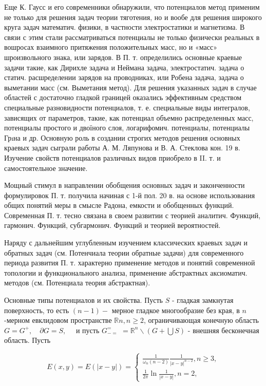 \documentclass[10pt]{article}
\begin{document}
Еще К. Гаусс и его современники обнаружили, что потенциалов метод применим не только для решения задач теории тяготения, но и вообе для решения широкого круга задач математич. физики, в частности электростатики и магнетизма. В связи с этим стали рассматриваться потенциалы не только физически реальных в вошросах взаимного притяжения положительных масс, но и «масс» шроизвольного знака, или зарядов. В П. т. определились основные краевые задачи такие, как Дирихле задача и Неймана задача, электростатич. задача о статич. расшределении зарядов на проводниках, или Робена задача, задача о выметании масс (см. Выметания метод). Для решения указанных задач в случае областей с достаточно гладкой границей оказались эффективным средством специальные разновидности потенциалов, т. е. специальные виды интегралов, зависящих от параметров, такие, как потенциал объемно распределенных масс, потенциалы простого и двоїного слоя, логарифомич. потенциалы, потенциалы Грıна и др. Основную роль в создании строгих методов решения основных краевых задач сыграли работы А. М. Ляпунова и В. А. Стеклова кон. 19 в. Изучение свойств потенциалов различных видов приобрело в II. т. и самостоятельное значение.



Мощный стимул в направлении обобщения основных задач и законченности формулировок П. т. получила начиная с 1-й пол. 20 в. на основе использования общих понятий меры в смысле Радона, емкости и обобщенных функций. Современная П. т. тесно связана в своем развитии с теорией аналитич. Функций, гармонич. Функций, субгармонич. Функций и теорией вероятностей.



Наряду с дальнейшим углубленным изучением классических краевых задач и обратных задач (см. Потенчиала теории обратные задачи) для современного периода развития П. т. характерно применение методов и понятий современной топологии и функционального анализа, применение абстрактных аксиоматич. методов (см. Потенциала теория абстрактная).



Основные типы потенциалов и их свойства. Пусть $S$ - гладкая замкнутая поверхность, то есть $(n-1)-$ мерное гладкое многообразие без края, в $n$-мерном евклидовом пространстве $\mathbb{R} n, n \geqslant 2$, ограничивающая конечную область $G=G^{+}, \quad \partial G=S, \quad$ и пусть $G_{-=}^{=}$ $=\mathbb{R}^{n} \backslash(G+\bigcup S)$ - внешняя бесконечная область. Пусть



\[

E(x, y)=E(|x-y|)=\left\{\begin{array}{l}

\frac{1}{\omega_{n}(n-2)} \frac{1}{|x-y|^{n-2}}, n \geqslant 3, \\

\frac{1}{2 \pi} \ln \frac{1}{|x-y|}, n=2,

\end{array}\right.

\]
\end{document}
